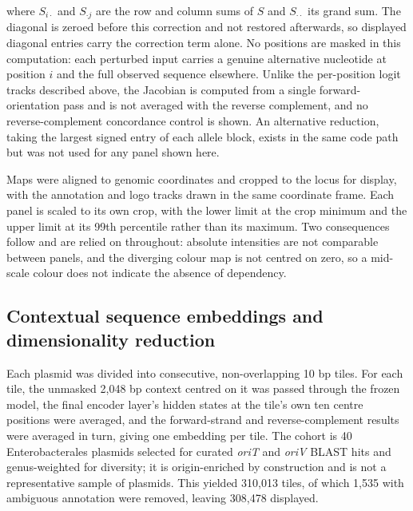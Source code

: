 where $S_{i\cdot}$ and $S_{\cdot j}$ are the row and column sums of $S$ and
$S_{\cdot\cdot}$ its grand sum. The diagonal is zeroed before this correction
and not restored afterwards, so displayed diagonal entries carry the
correction term alone. No positions are masked in this computation: each
perturbed input carries a genuine alternative nucleotide at position $i$ and
the full observed sequence elsewhere. Unlike the per-position logit tracks
described above, the Jacobian is computed from a single forward-orientation
pass and is not averaged with the reverse complement, and no
reverse-complement concordance control is shown. An alternative reduction,
taking the largest signed entry of each allele block, exists in the same code
path but was not used for any panel shown here.

Maps were aligned to genomic coordinates and cropped to the locus for
display, with the annotation and logo tracks drawn in the same coordinate
frame. Each panel is scaled to its own crop, with the lower limit at the crop
minimum and the upper limit at its 99th percentile rather than its maximum.
Two consequences follow and are relied on throughout: absolute intensities
are not comparable between panels, and the diverging colour map is not
centred on zero, so a mid-scale colour does not indicate the absence of
dependency.

\subsection*{Contextual sequence embeddings and dimensionality reduction}

Each plasmid was divided into consecutive, non-overlapping 10 bp tiles. For
each tile, the unmasked 2,048 bp context centred on it was passed through the
frozen model, the final encoder layer's hidden states at the tile's own ten
centre positions were averaged, and the forward-strand and reverse-complement
results were averaged in turn, giving one embedding per tile. The cohort is
40 Enterobacterales plasmids selected for curated \emph{oriT} and \emph{oriV}
BLAST hits and genus-weighted for diversity; it is origin-enriched by
construction and is not a representative sample of plasmids. This yielded
310,013 tiles, of which 1,535 with ambiguous annotation were removed, leaving
308,478 displayed.


